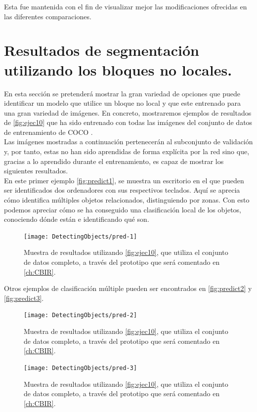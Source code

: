 Esta fue mantenida con el fin de visualizar mejor las modificaciones ofrecidas en las diferentes comparaciones.

\newpage
\section{Resultados de segmentación utilizando los bloques no locales.}\label{resultados}
En esta sección se pretenderá mostrar la gran variedad de opciones que puede identificar un modelo que utilice un bloque no local y que este entrenado para una gran variedad de imágenes. En concreto, mostraremos ejemplos de resultados de \autoref{fig:ejec10} que ha sido entrenado con todas las imágenes del conjunto de datos de entrenamiento de COCO \cite{COCO}.\\

Las imágenes mostradas a continuación pertenecerán al subconjunto de validación y, por tanto, estas no han sido aprendidas de forma explícita por la red sino que, gracias a lo aprendido durante el entrenamiento, es capaz de mostrar los siguientes resultados.\\

En este primer ejemplo \autoref{fig:predict1}, se muestra un escritorio en el que pueden ser identificados dos ordenadores con sus respectivos teclados. Aquí se aprecia cómo identifica múltiples objetos relacionados, distinguiendo por zonas. Con esto podemos apreciar cómo se ha conseguido una clasificación local de los objetos, conociendo dónde están e identificando qué son.\\
\begin{figure}[h!]
  \centering
  \texttt{[image: DetectingObjects/pred-1]}
  \caption{Muestra de resultados utilizando \autoref{fig:ejec10}, que utiliza el conjunto de datos completo, a través del prototipo que será comentado en \autoref{ch:CBIR}.}
  \label{fig:predict1}
\end{figure}

Otros ejemplos de clasificación múltiple pueden ser encontrados en \autoref{fig:predict2} y \autoref{fig:predict3}.\\
\begin{figure}[h!]
  \centering
  \texttt{[image: DetectingObjects/pred-2]}
  \caption{Muestra de resultados utilizando \autoref{fig:ejec10}, que utiliza el conjunto de datos completo, a través del prototipo que será comentado en \autoref{ch:CBIR}.}
  \label{fig:predict2}
\end{figure}
\begin{figure}[h!]
  \centering
  \texttt{[image: DetectingObjects/pred-3]}
  \caption{Muestra de resultados utilizando \autoref{fig:ejec10}, que utiliza el conjunto de datos completo, a través del prototipo que será comentado en \autoref{ch:CBIR}.}
  \label{fig:predict3}
\end{figure}

